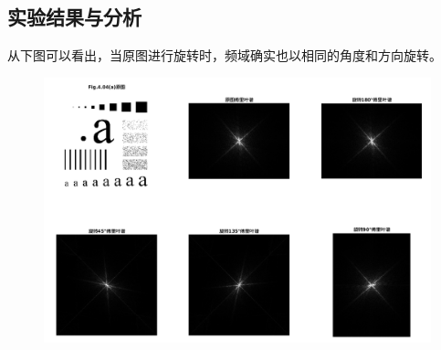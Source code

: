 \documentclass[logo,reportComp]{thesis}
\begin{document}
\subsection{实验结果与分析}
从下图可以看出，当原图进行旋转时，频域确实也以相同的角度和方向旋转。
\begin{figure}[H]
\centering
\includegraphics[width=\linewidth]{fig/06.png}
\end{figure}


\appendix\appendixconfig
\end{document}
